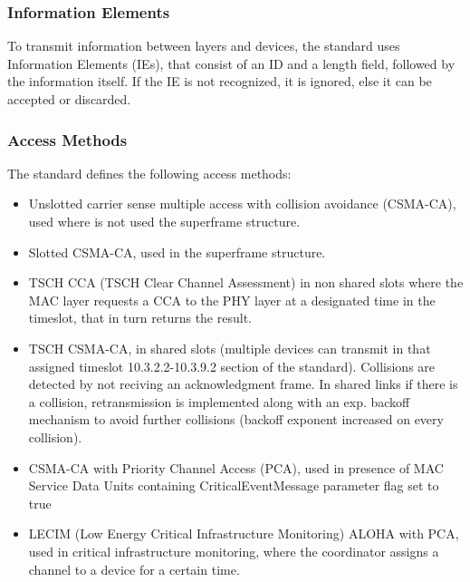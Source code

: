 \documentclass[conference]{IEEEtran}
\begin{document}
\subsubsection{Information Elements}
To transmit information between layers and devices, the standard uses Information Elements 
(IEs), that consist of an ID and a length field, followed by the information itself. If the
IE is not recognized, it is ignored, else it can be accepted or discarded.\\

\subsubsection{Access Methods}
The standard defines the following access methods:
\begin{itemize}
    \item Unslotted carrier sense multiple access with collision avoidance (CSMA-CA), 
          used where is not used the superframe structure.
    \item Slotted CSMA-CA, used in the superframe structure.
    \item TSCH CCA (TSCH Clear Channel Assessment) in non shared slots where the MAC layer requests a CCA
          to the PHY layer at a designated time in the timeslot,
          that in turn returns the result.
    \item TSCH CSMA-CA, in shared slots (multiple devices can transmit in that assigned 
          timeslot 10.3.2.2-10.3.9.2 section of the standard). Collisions are detected by not
          reciving an acknowledgment frame. In shared links if there is a collision, 
          retransmission is implemented along with an exp. backoff mechanism to avoid further
          collisions (backoff exponent increased on every collision).
    \item CSMA-CA with Priority Channel Access (PCA), used in presence of MAC Service Data 
          Units containing CriticalEventMessage parameter flag set to true
    \item LECIM (Low Energy Critical Infrastructure Monitoring) ALOHA with PCA, used in 
          critical infrastructure monitoring, where the coordinator assigns a channel to a device
          for a certain time.
\end{itemize}
\end{document}
